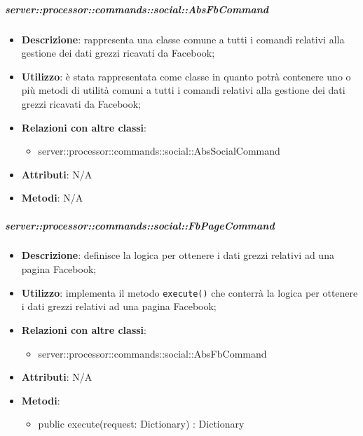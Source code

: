         \subparagraph{server::processor::commands::social::AbsFbCommand} %
        \label{subp:bdsm_app_server_processor_commands_social_absfbcommand}
        \begin{itemize}
          \item \textbf{Descrizione}: rappresenta una classe comune a tutti i comandi relativi alla gestione dei dati grezzi ricavati da Facebook;
          \item \textbf{Utilizzo}: è stata rappresentata come classe in quanto potrà contenere uno o più metodi di utilità comuni a tutti i comandi relativi alla gestione dei dati grezzi ricavati da Facebook;
          \item \textbf{Relazioni con altre classi}:
            \begin{itemize}
              \item server::processor::commands::social::AbsSocialCommand
            \end{itemize}
			\item \textbf{Attributi}: N/A
			\item \textbf{Metodi}: N/A
        \end{itemize}

        \subparagraph{server::processor::commands::social::FbPageCommand} %
        \label{subp:bdsm_app_server_processor_commands_social_fbpagecommand}
        \begin{itemize}
          \item \textbf{Descrizione}: definisce la logica per ottenere i dati grezzi relativi ad una pagina Facebook;
          \item \textbf{Utilizzo}: implementa il metodo \texttt{execute()} che conterrà la logica per ottenere i dati grezzi relativi ad una pagina Facebook;
          \item \textbf{Relazioni con altre classi}:
            \begin{itemize}
              \item server::processor::commands::social::AbsFbCommand
            \end{itemize}
			\item \textbf{Attributi}: N/A
			\item \textbf{Metodi}:
        	\begin{itemize}
          		\item public execute(request: Dictionary) : Dictionary
        	\end{itemize}
        \end{itemize}

